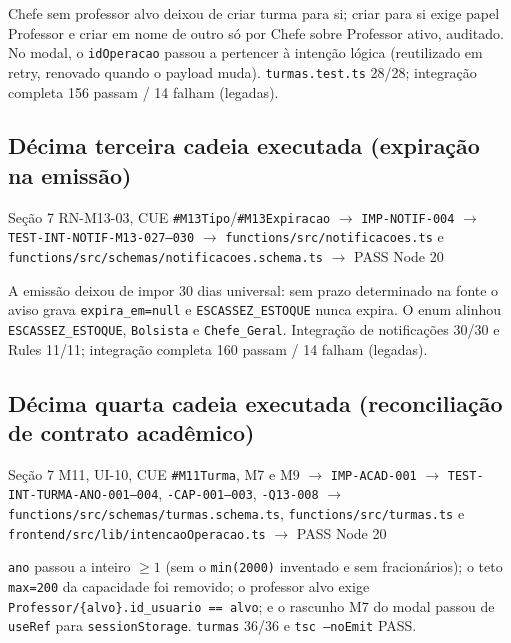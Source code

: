 Chefe sem professor alvo deixou de criar turma para si; criar para si exige
papel Professor e criar em nome de outro só por Chefe sobre Professor ativo,
auditado. No modal, o \texttt{idOperacao} passou a pertencer à intenção lógica
(reutilizado em retry, renovado quando o payload muda). \texttt{turmas.test.ts}
28/28; integração completa 156 passam / 14 falham (legadas).

\subsection{Décima terceira cadeia executada (expiração na emissão)}

\begin{center}
Seção 7 RN-M13-03, CUE \texttt{\#M13Tipo}/\texttt{\#M13Expiracao}
$\rightarrow$ \texttt{IMP-NOTIF-004}
$\rightarrow$ \texttt{TEST-INT-NOTIF-M13-027--030}
$\rightarrow$ \nolinkurl{functions/src/notificacoes.ts} e \nolinkurl{functions/src/schemas/notificacoes.schema.ts}
$\rightarrow$ PASS Node 20
\end{center}

A emissão deixou de impor 30 dias universal: sem prazo determinado na fonte o
aviso grava \texttt{expira\_em=null} e \texttt{ESCASSEZ\_ESTOQUE} nunca expira.
O enum alinhou \texttt{ESCASSEZ\_ESTOQUE}, \texttt{Bolsista} e
\texttt{Chefe\_Geral}. Integração de notificações 30/30 e Rules 11/11;
integração completa 160 passam / 14 falham (legadas).

\subsection{Décima quarta cadeia executada (reconciliação de contrato acadêmico)}

\begin{center}
Seção 7 M11, UI-10, CUE \texttt{\#M11Turma}, M7 e M9
$\rightarrow$ \texttt{IMP-ACAD-001}
$\rightarrow$ \texttt{TEST-INT-TURMA-ANO-001--004}, \texttt{-CAP-001--003}, \texttt{-Q13-008}
$\rightarrow$ \nolinkurl{functions/src/schemas/turmas.schema.ts}, \nolinkurl{functions/src/turmas.ts} e \nolinkurl{frontend/src/lib/intencaoOperacao.ts}
$\rightarrow$ PASS Node 20
\end{center}

\texttt{ano} passou a inteiro $\ge 1$ (sem o \texttt{min(2000)} inventado e sem
fracionários); o teto \texttt{max=200} da capacidade foi removido; o professor
alvo exige \texttt{Professor/\{alvo\}.id\_usuario == alvo}; e o rascunho M7 do
modal passou de \texttt{useRef} para \texttt{sessionStorage}. \texttt{turmas}
36/36 e \texttt{tsc --noEmit} PASS.

